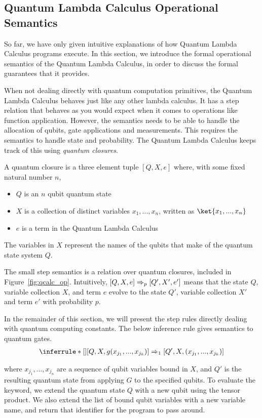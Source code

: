 \subsection{Quantum Lambda Calculus Operational Semantics}
So far, we have only given intuitive explanations of how Quantum Lambda Calculus programs execute.
In this section, we introduce the formal operational semantics of the Quantum Lambda Calculus, in order to discuss the formal guarantees that it provides.

When not dealing directly with quantum computation primitives, the Quantum Lambda Calculus behaves just like any other lambda calculus.
It has a step relation that behaves as you would expect when it comes to operations like function application.
However, the semantics needs to be able to handle the allocation of qubits, gate applications and measurements. 
This requires the semantics to handle state and probability.
The Quantum Lambda Calculus keeps track of this using \textit{quantum closures}.
\begin{definition}
    A quantum closure is a three element tuple $[Q,X,e]$ where, with some fixed natural number $n$,
    \begin{itemize}
        \item $Q$ is an $n$ qubit quantum state
        \item $X$ is a collection of distinct variables $x_1,..., x_n$, written as $\ket{x_1,..., x_n}$
        \item $e$ is a term in the Quantum Lambda Calculus
    \end{itemize}
    The variables in $X$ represent the names of the qubits that make of the quantum state system $Q$.
\end{definition}
The small step semantics is a relation over quantum closures, included in Figure~\ref{fig:qcalc_op}. 
Intuitively, $[Q,X,e] \Rightarrow_{p} [Q',X',e']$ means that the state $Q$, variable collection $X$, and term $e$ evolve to the state $Q'$, variable collection $X'$ and term $e'$ with probability $p$.

In the remainder of this section, we will present the step rules directly dealing with quantum computing constants.
The below inference rule gives semantics to quantum gates.
\begin{align*}
    \inferrule*[]{ }{
    [Q,X, g (x_{j_1},...,x_{j_k})] \qstep{1} [Q',X, (x_{j_1},...,x_{j_k})]}
\end{align*}

where $x_{j_1},...,x_{j_n}$ are a sequence of qubit variables bound in $X$, and $Q'$ is the resulting quantum state from applying $G$ to the specified qubits.
To evaluate the  keyword, we extend the quantum state $Q$ with a new qubit using the tensor product.
We also extend the list of bound qubit variables with a new variable name, and return that identifier for the program to pass around.


